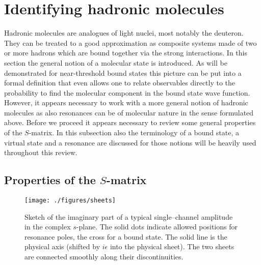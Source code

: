 
\section{Identifying hadronic molecules }
\label{sec:3}

Hadronic molecules are analogues of  light nuclei, most notably the deuteron. 
They can be treated to a good approximation as composite systems made of two 
or more hadrons which are bound together via the strong interactions.
In this section the general notion of a molecular state is introduced. As will
be demonstrated for near-threshold bound states this picture can be put into a
formal definition that even allows one to relate observables directly to the
probability to find the molecular component in the bound state wave function.
However, it appears necessary to work with a more general notion of hadronic
molecules as also resonances can be of molecular nature in the sense formulated
above. Before we proceed it appears necessary to review some general properties
of the $S$-matrix. In this subsection also the terminology of a bound state, a
virtual state and a resonance are discussed for those notions will be heavily
used throughout this review.


\subsection{Properties of the {\boldmath$S$}-matrix} 
\label{sec:Sproperties}

\begin{figure*}
 \centering
   \texttt{[image: ./figures/sheets]}
   \caption{Sketch of the imaginary part of a typical single--channel amplitude in 
the complex $s$-plane. The solid dots indicate allowed positions for resonance poles,
the cross for a bound state.
The solid line is the physical axis (shifted by $i\epsilon$ into the physical sheet).
The two sheets are connected smoothly along their discontinuities.
\label{sheets}}
\end{figure*}

